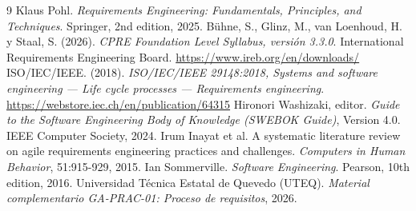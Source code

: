\documentclass[12pt,a4paper]{article}
\begin{document}
\begin{thebibliography}{9}
 Klaus Pohl. \emph{Requirements Engineering: Fundamentals, Principles, and Techniques}. Springer, 2nd edition, 2025.
 Bühne, S., Glinz, M., van Loenhoud, H. y Staal, S. (2026). \emph{CPRE Foundation Level Syllabus, versión 3.3.0}. International Requirements Engineering Board. \url{https://www.ireb.org/en/downloads/}
 ISO/IEC/IEEE. (2018). \emph{ISO/IEC/IEEE 29148:2018, Systems and software engineering — Life cycle processes — Requirements engineering}. \url{https://webstore.iec.ch/en/publication/64315}
 Hironori Washizaki, editor. \emph{Guide to the Software Engineering Body of Knowledge (SWEBOK Guide)}, Version 4.0. IEEE Computer Society, 2024.
 Irum Inayat et al. A systematic literature review on agile requirements engineering practices and challenges. \emph{Computers in Human Behavior}, 51:915-929, 2015.
 Ian Sommerville. \emph{Software Engineering}. Pearson, 10th edition, 2016.
 Universidad Técnica Estatal de Quevedo (UTEQ). \emph{Material complementario GA-PRAC-01: Proceso de requisitos}, 2026.
\end{thebibliography}
\end{document}
